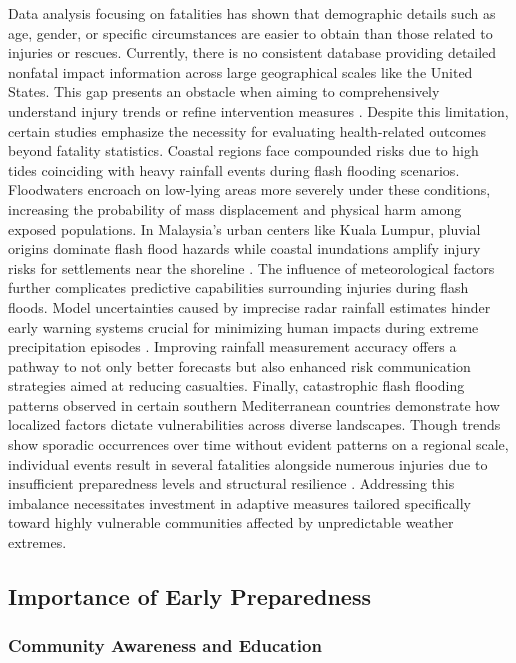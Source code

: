 Data analysis focusing on fatalities has shown that demographic details such as age, gender, or specific circumstances are easier to obtain than those related to injuries or rescues. Currently, there is no consistent database providing detailed nonfatal impact information across large geographical scales like the United States. This gap presents an obstacle when aiming to comprehensively understand injury trends or refine intervention measures \citep{Terti2017}. Despite this limitation, certain studies emphasize the necessity for evaluating health-related outcomes beyond fatality statistics.
Coastal regions face compounded risks due to high tides coinciding with heavy rainfall events during flash flooding scenarios. Floodwaters encroach on low-lying areas more severely under these conditions, increasing the probability of mass displacement and physical harm among exposed populations. In Malaysia's urban centers like Kuala Lumpur, pluvial origins dominate flash flood hazards while coastal inundations amplify injury risks for settlements near the shoreline \citep{Maqtan2022a}\citep{Maqtan2022b}.
The influence of meteorological factors further complicates predictive capabilities surrounding injuries during flash floods. Model uncertainties caused by imprecise radar rainfall estimates hinder early warning systems crucial for minimizing human impacts during extreme precipitation episodes \citep{Yatheendradas2008}. Improving rainfall measurement accuracy offers a pathway to not only better forecasts but also enhanced risk communication strategies aimed at reducing casualties.
Finally, catastrophic flash flooding patterns observed in certain southern Mediterranean countries demonstrate how localized factors dictate vulnerabilities across diverse landscapes. Though trends show sporadic occurrences over time without evident patterns on a regional scale, individual events result in several fatalities alongside numerous injuries due to insufficient preparedness levels and structural resilience \citep{Llasat2010}. Addressing this imbalance necessitates investment in adaptive measures tailored specifically toward highly vulnerable communities affected by unpredictable weather extremes.

\subsection{Importance of Early Preparedness}

\subsubsection{Community Awareness and Education}

